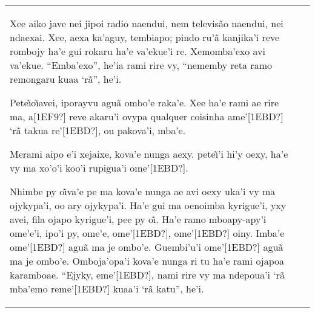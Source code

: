 \documentclass{article}
\begin{document}
\begin{flushleft}
\tablehead{}
\begin{supertabular}{m{2.8781598in}|m{2.87756in}}
Xee aiko jave nei jipoi radio naendui, nem televis\~ao naendui, nei
ndaexai. Xee, aexa ka{\textquoteright}aguy, tembiapo; pindo
ru{\textquoteright}\~a kanjika{\textquoteright}i reve rombojy
ha{\textquoteright}e gui rokaru ha{\textquoteright}e
va{\textquoteright}ekue{\textquoteright}i re.
Xemomba{\textquoteright}exo avi va{\textquoteright}ekue.
{\textquotedblleft}Emba{\textquoteright}exo{\textquotedblright},
he{\textquoteright}ia rami rire vy, {\textquotedblleft}nememby reta
ramo remongaru kuaa {\textquoteleft}r\~a{\textquotedblright},
he{\textquoteright}i.  

Pete\~\i o\~\i avei, iporayvu agu\~a ombo{\textquoteright}e
raka{\textquoteright}e.  Xee ha{\textquoteright}e rami ae rire ma,
a[1EF9?] reve akaru{\textquoteright}i  ovypa qualquer coisinha
ame{\textquoteright}[1EBD?] {\textquoteleft}r\~a takua
re{\textquoteright}[1EBD?], ou pakova{\textquoteright}i,
mba{\textquoteright}e. 

Merami aipo e{\textquoteright}i xejaixe, kova{\textquoteright}e nunga
aexy. pete\~\i{\textquoteright}i hi{\textquoteright}y oexy,
ha{\textquoteright}e vy ma xo{\textquoteright}o{\textquoteright}i
koo{\textquoteright}i rupigua{\textquoteright}i
ome{\textquoteright}[1EBD?]. 

Nhimbe py o\~\i va{\textquoteright}e pe ma kova{\textquoteright}e nunga
ae avi oexy uka{\textquoteright}i vy ma ojykypa{\textquoteright}i, oo
ary ojykypa{\textquoteright}i. Ha{\textquoteright}e gui ma oenoimba
kyrigue{\textquoteright}i, yxy avei, fila ojapo
kyrigue{\textquoteright}i, pee py o\~\i. Ha{\textquoteright}e ramo
mboapy-apy{\textquoteright}i ome{\textquoteright}e{\textquoteright}i,
ipo{\textquoteright}i py, ome{\textquoteright}e,
ome{\textquoteright}[1EBD?], ome{\textquoteright}[1EBD?] oiny.
Imba{\textquoteright}e ome{\textquoteright}[1EBD?] agu\~a ma je
ombo{\textquoteright}e. Guembi{\textquoteright}u{\textquoteright}i
ome{\textquoteright}[1EBD?] agu\~a ma je ombo{\textquoteright}e. 
Omboja{\textquoteright}opa{\textquoteright}i kova{\textquoteright}e
nunga ri tu ha{\textquoteright}e rami ojapoa karamboae.
{\textquotedblleft}Ejyky, eme{\textquoteright}[1EBD?], nami rire vy ma
ndepoua{\textquoteright}i {\textquoteleft}r\~a mba{\textquoteright}emo
reme{\textquoteright}[1EBD?] kuaa{\textquoteright}i
{\textquoteleft}r\~a katu{\textquotedblright}, he{\textquoteright}i. 


\end{supertabular}
\end{flushleft}
\end{document}
